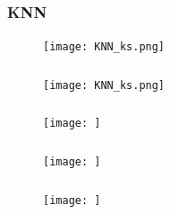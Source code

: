 \documentclass{beamer}
\begin{document}
\begin{frame}

\frametitle{KNN}

\begin{figure}[t]
\centering
\texttt{[image: KNN\_ks.png]}

\end{figure}


\end{frame}



%
%
%

\begin{frame}

\frametitle{}

\begin{figure}[t]
\centering
\texttt{[image: KNN\_ks.png]}

\end{figure}

% 
\end{frame}



%
%
%


\begin{frame}

\frametitle{}

\begin{figure}[t]
\centering
\texttt{[image:  ]}

\end{figure}

% 
\end{frame}





%
%



\begin{frame}

\frametitle{}

\begin{figure}[t]
\centering
\texttt{[image:  ]}

\end{figure}


\end{frame}









%
%

\begin{frame}

\frametitle{}

\begin{figure}[t]
\centering
\texttt{[image:  ]}

\end{figure}


\end{frame}
\end{document}
